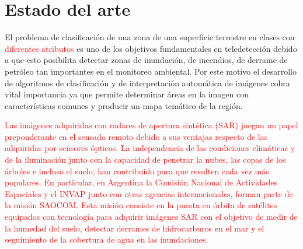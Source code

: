 \documentclass[11pt]{article}
\begin{document}
\section{Estado del arte}

El problema de clasificación de una zona de una superficie terrestre en clases con \textcolor{red}{diferentes atributos} es uno de los objetivos fundamentales en teledetección debido a que esto posibilita detectar zonas de inundación, de incendios, de derrame de petróleo tan importantes en el monitoreo ambiental. Por este motivo el desarrollo de algoritmos de clasificación y de interpretación automática de imágenes cobra vital importancia  ya que permite determinar áreas en la imagen con características comunes  y producir un mapa temático de la región. 

\textcolor{red}{Las imágenes adquiridas con radares de apertura sintética (SAR) juegan un papel preponderante en el sensado remoto debido a sus ventajas respecto de las adquiridas por sensores ópticos. La independencia de las condiciones climáticas y de la iluminación junto con la capacidad de penetrar la nubes, las copas de los árboles e incluso el suelo, han contribuido para que resulten cada vez más populares. }
\textcolor{red}{
En particular, en Argentina la Comisión Nacional de Actividades Espaciales y el INVAP junto con otras agencias internacionales, forman parte de la misión SAOCOM. Esta misión consiste en la puesta en órbita de satélites equipados con tecnología para adquirir imágenes SAR con el objetivo de medir de la humedad del suelo, detectar derrames de hidrocarburos en el mar y el seguimiento de la cobertura de agua en las inundaciones. }
\end{document}

